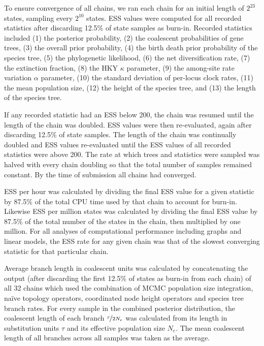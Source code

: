 \documentclass[nogrid]{MBE}%
\begin{document}
To ensure convergence of all chains, we ran each chain for an initial length of
$2^{23}$ states, sampling every $2^{10}$ states. ESS values were computed for
all recorded statistics after discarding 12.5\% of state samples as burn-in.
Recorded statistics included (1) the posterior probability, (2) the coalescent
probabilities of gene trees, (3) the overall prior probability, (4) the birth
death prior probability of the species tree, (5) the phylogenetic likelihood,
(6) the net diversification rate, (7) the extinction fraction, (8) the HKY
$\kappa$ parameter, (9) the among-site rate variation $\alpha$ parameter, (10)
the standard deviation of per-locus clock rates, (11) the mean population size,
(12) the height of the species tree, and (13) the length of the species tree.

If any recorded statistic had an ESS below 200, the chain was resumed until the
length of the chain was doubled. ESS values were then re-evaluated, again after
discarding 12.5\% of state samples. The length of the chain was continually
doubled and ESS values re-evaluated until the ESS values of all recorded
statistics were above 200. The rate at which trees and statistics were sampled
was halved with every chain doubling so that the total number of samples
remained constant. By the time of submission all chains had converged.

ESS per hour was calculated by dividing the final ESS value for a given
statistic by 87.5\% of the total CPU time used by that chain to account for
burn-in. Likewise ESS per million states was calculated by dividing the final
ESS value by 87.5\% of the total number of the states in the chain, then
multiplied by one million. For all analyses of computational performance
including graphs and linear models, the ESS rate for any given chain was that of
the slowest converging statistic for that particular chain.

Average branch length in coalescent units was calculated by concatenating the
output (after discarding the first 12.5\% of states as burn-in from each chain) of all 32 chains
which used the combination of MCMC population size integration, na\"ive topology
operators, coordinated node height operators and species tree branch rates. For
every sample in the combined posterior distribution, the coalescent length of
each branch $\nicefrac{\tau}{2N_e}$ was calculated from its length in
substitution units $\tau$ and its effective population size $N_e$. The mean
coalescent length of all branches across all samples was taken as the average.
\end{document}
